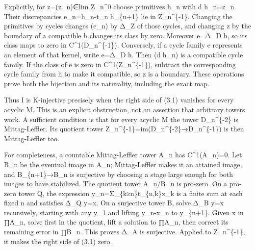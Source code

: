 \documentclass[11pt]{article}
\begin{document}
Explicitly,\allowbreak{} for z\allowbreak{}=(z\_\allowbreak{}n)\allowbreak{}\allowbreak{}∈lim Z\_\allowbreak{}n\textasciicircum{}0 choose primitives h\_\allowbreak{}n with d h\_\allowbreak{}n\allowbreak{}=z\_\allowbreak{}n. Their discrepancies e\_\allowbreak{}n\allowbreak{}=h\_\allowbreak{}n-t\_\allowbreak{}n h\_\allowbreak{}\{n\allowbreak{}+1\} lie in Z\_\allowbreak{}n\textasciicircum{}\{-1\}. Changing the primitives by cycles changes (e\_\allowbreak{}n)\allowbreak{} by Δ\_\allowbreak{}Z of those cycles,\allowbreak{} and changing z by the boundary of a compatible h changes its class by zero. Moreover e\allowbreak{}=Δ\_\allowbreak{}D h,\allowbreak{} so its class maps to zero in C\textasciicircum{}1(D\_\allowbreak{}n\textasciicircum{}\{-1\})\allowbreak{}. Conversely,\allowbreak{} if a cycle family e represents an element of that kernel,\allowbreak{} write e\allowbreak{}=Δ\_\allowbreak{}D h. Then (d h\_\allowbreak{}n)\allowbreak{} is a compatible cycle family. If the class of e is zero in C\textasciicircum{}1(Z\_\allowbreak{}n\textasciicircum{}\{-1\})\allowbreak{},\allowbreak{} subtract the corresponding cycle family from h to make it compatible,\allowbreak{} so z is a boundary. These operations prove both the bijection and its naturality,\allowbreak{} including the exact map.

Thus I is K-injective precisely when the right side of (3.1)\allowbreak{} vanishes for every acyclic M. This is an explicit obstruction,\allowbreak{} not an assertion that arbitrary towers work. A sufficient condition is that for every acyclic M the tower D\_\allowbreak{}n\textasciicircum{}\{-2\} is Mittag-Leffler. Its quotient tower Z\_\allowbreak{}n\textasciicircum{}\{-1\}\allowbreak{}=im(D\_\allowbreak{}n\textasciicircum{}\{-2\}\allowbreak{}→D\_\allowbreak{}n\textasciicircum{}\{-1\})\allowbreak{} is then Mittag-Leffler too.

For completeness,\allowbreak{} a countable Mittag-Leffler tower A\_\allowbreak{}n has C\textasciicircum{}1(A\_\allowbreak{}n)\allowbreak{}\allowbreak{}=0. Let B\_\allowbreak{}n be the eventual image in A\_\allowbreak{}n; Mittag-Leffler makes it an attained image,\allowbreak{} and B\_\allowbreak{}\{n\allowbreak{}+1\}\allowbreak{}→B\_\allowbreak{}n is surjective by choosing a stage large enough for both images to have stabilized. The quotient tower A\_\allowbreak{}n/\allowbreak{}B\_\allowbreak{}n is pro-zero. On a pro-zero tower Q,\allowbreak{} the expression y\_\allowbreak{}n\allowbreak{}=Σ\_\allowbreak{}\{k≥n\}t\_\allowbreak{}\{n,\allowbreak{}k\}x\_\allowbreak{}k is a finite sum at each fixed n and satisfies Δ\_\allowbreak{}Q y\allowbreak{}=x. On a surjective tower B,\allowbreak{} solve Δ\_\allowbreak{}B y\allowbreak{}=x recursively,\allowbreak{} starting with any y\_\allowbreak{}1 and lifting y\_\allowbreak{}n-x\_\allowbreak{}n to y\_\allowbreak{}\{n\allowbreak{}+1\}. Given x in ∏A\_\allowbreak{}n,\allowbreak{} solve first in the quotient,\allowbreak{} lift a solution to ∏A\_\allowbreak{}n,\allowbreak{} then correct its remaining error in ∏B\_\allowbreak{}n. This proves Δ\_\allowbreak{}A is surjective. Applied to Z\_\allowbreak{}n\textasciicircum{}\{-1\},\allowbreak{} it makes the right side of (3.1)\allowbreak{} zero.
\end{document}
